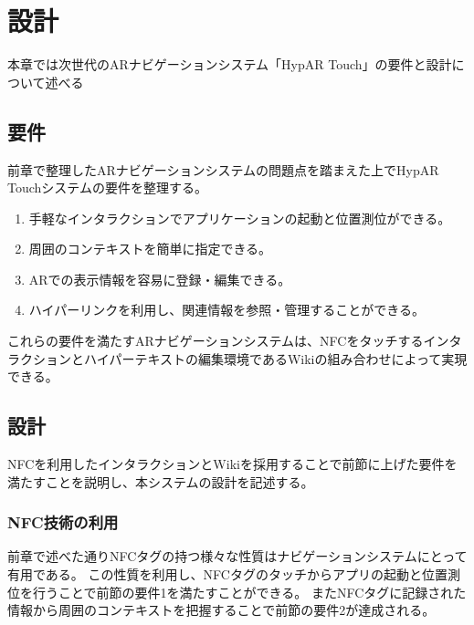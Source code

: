 \chapter{設計}
\label{chap:design}

本章では次世代のARナビゲーションシステム「HypAR Touch」の要件と設計について述べる

\newpage

\section{要件}
前章で整理したARナビゲーションシステムの問題点を踏まえた上でHypAR Touchシステムの要件を整理する。
\begin{enumerate}
  \item 手軽なインタラクションでアプリケーションの起動と位置測位ができる。
  \item 周囲のコンテキストを簡単に指定できる。
  \item ARでの表示情報を容易に登録・編集できる。
  \item ハイパーリンクを利用し、関連情報を参照・管理することができる。
\end{enumerate}
これらの要件を満たすARナビゲーションシステムは、NFCをタッチするインタラクションとハイパーテキストの編集環境であるWikiの組み合わせによって実現できる。

\section{設計}
NFCを利用したインタラクションとWikiを採用することで前節に上げた要件を満たすことを説明し、本システムの設計を記述する。

\subsection{NFC技術の利用}
前章で述べた通りNFCタグの持つ様々な性質はナビゲーションシステムにとって有用である。
この性質を利用し、NFCタグのタッチからアプリの起動と位置測位を行うことで前節の要件1を満たすことができる。
またNFCタグに記録された情報から周囲のコンテキストを把握することで前節の要件2が達成される。

